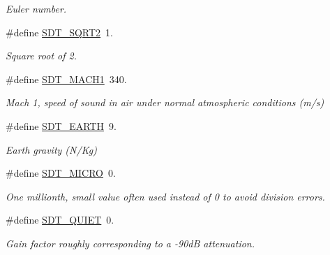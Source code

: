 \begin{DoxyCompactItemize}
\begin{DoxyCompactList}\small\item\em Euler number. \end{DoxyCompactList}\item 
\hypertarget{group__common_ga149970c64ee7b729156953a71d24223d}{}\#define \hyperlink{group__common_ga149970c64ee7b729156953a71d24223d}{S\+D\+T\+\_\+\+S\+Q\+R\+T2}~1.\label{group__common_ga149970c64ee7b729156953a71d24223d}

\begin{DoxyCompactList}\small\item\em Square root of 2. \end{DoxyCompactList}\item 
\hypertarget{group__common_ga641499cf76fa8e50f871ad145c4c9b68}{}\#define \hyperlink{group__common_ga641499cf76fa8e50f871ad145c4c9b68}{S\+D\+T\+\_\+\+M\+A\+C\+H1}~340.\label{group__common_ga641499cf76fa8e50f871ad145c4c9b68}

\begin{DoxyCompactList}\small\item\em Mach 1, speed of sound in air under normal atmospheric conditions (m/s) \end{DoxyCompactList}\item 
\hypertarget{group__common_ga2c3bdb95665df0c14dd07517626256f6}{}\#define \hyperlink{group__common_ga2c3bdb95665df0c14dd07517626256f6}{S\+D\+T\+\_\+\+E\+A\+R\+T\+H}~9.\label{group__common_ga2c3bdb95665df0c14dd07517626256f6}

\begin{DoxyCompactList}\small\item\em Earth gravity (N/\+Kg) \end{DoxyCompactList}\item 
\hypertarget{group__common_ga90bed1c5b421a03bb5fc8f374412b5ae}{}\#define \hyperlink{group__common_ga90bed1c5b421a03bb5fc8f374412b5ae}{S\+D\+T\+\_\+\+M\+I\+C\+R\+O}~0.\label{group__common_ga90bed1c5b421a03bb5fc8f374412b5ae}

\begin{DoxyCompactList}\small\item\em One millionth, small value often used instead of 0 to avoid division errors. \end{DoxyCompactList}\item 
\hypertarget{group__common_gaccd642eb1aafd33fddc68063344452eb}{}\#define \hyperlink{group__common_gaccd642eb1aafd33fddc68063344452eb}{S\+D\+T\+\_\+\+Q\+U\+I\+E\+T}~0.\label{group__common_gaccd642eb1aafd33fddc68063344452eb}

\begin{DoxyCompactList}\small\item\em Gain factor roughly corresponding to a -\/90d\+B attenuation. \end{DoxyCompactList}\end{DoxyCompactItemize}
